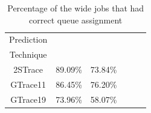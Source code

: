 \begin{table}[tp]
  \caption{Percentage of the wide jobs that had correct queue assignment 
    }
\vspace{-0.1in}
\label{table:sim:correctQueue}
  \centering
      {\small
	\begin{tabular}{|c|c|c|c|c|c|} 
	  \hline
		Prediction&	\slearn &\primarybasepredict \\%
		Technique&&\\%
	  \hline
		2STrace &89.09\%&73.84\%\\%
		GTrace11 &86.45\%&76.20\%\\%
		GTrace19 &73.96\%&58.07\%\\%
	  \hline
	\end{tabular}
      }
\vspace{-0.1in}
\end{table}

